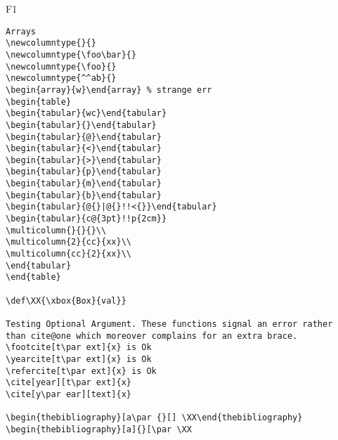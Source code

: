 \documentclass{article}
\begin{document}
\begin{filecontents+}{F1}
\begin{Verbatim}
Arrays
\newcolumntype{}{}
\newcolumntype{\foo\bar}{}
\newcolumntype{\foo}{}
\newcolumntype{^^ab}{}
\begin{array}{w}\end{array} % strange err
\begin{table}
\begin{tabular}{wc}\end{tabular}
\begin{tabular}{}\end{tabular}
\begin{tabular}{@}\end{tabular}
\begin{tabular}{<}\end{tabular}
\begin{tabular}{>}\end{tabular}
\begin{tabular}{p}\end{tabular}
\begin{tabular}{m}\end{tabular}
\begin{tabular}{b}\end{tabular}
\begin{tabular}{@{}|@{}!!<{}}\end{tabular}
\begin{tabular}{c@{3pt}!!p{2cm}}
\multicolumn{}{}{}\\
\multicolumn{2}{cc}{xx}\\
\multicolumn{cc}{2}{xx}\\
\end{tabular}
\end{table}

\def\XX{\xbox{Box}{val}}

Testing Optional Argument. These functions signal an error rather
than cite@one which moreover complains for an extra brace.
\footcite[t\par ext]{x} is Ok 
\yearcite[t\par ext]{x} is Ok
\refercite[t\par ext]{x} is Ok
\cite[year][t\par ext]{x}
\cite[y\par ear][text]{x}

\begin{thebibliography}[a\par {}[] \XX\end{thebibliography}
\begin{thebibliography}[a]{}[\par \XX


\end{Verbatim}
\end{filecontents+}
\end{document}
